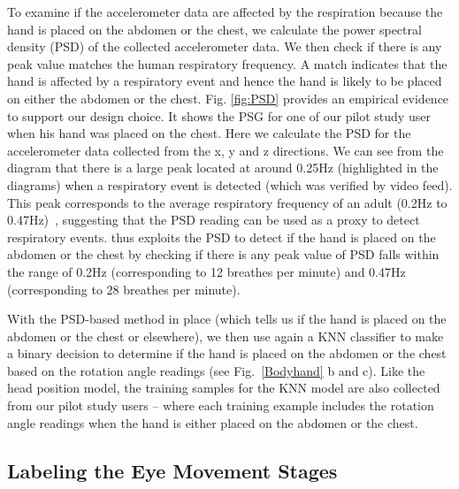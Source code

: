 To examine if the accelerometer data are affected by the respiration because the hand is placed on the abdomen or the chest, we calculate
the power spectral density (PSD) of the collected accelerometer data. We then check if there is any peak value matches the human
respiratory frequency. A match indicates that the hand is affected by a respiratory event and hence the hand is likely to be placed on
either the abdomen or the chest. Fig. \ref{fig:PSD} provides an empirical evidence to support our design choice. It shows the PSG for one
of our pilot study user when his hand was placed on the chest. Here we calculate the PSD for the accelerometer data collected from the x, y
and z directions. We can see from the diagram that there is a large peak located at around 0.25Hz (highlighted in the diagrams) when a
respiratory event is detected (which was verified by video feed). This peak corresponds to the average respiratory frequency of an
adult (0.2Hz to 0.47Hz)~\cite{Breath_frequence}, suggesting that the PSD reading can be used as a proxy to detect respiratory events.
\systemname thus exploits the PSD to detect if the hand is placed on the abdomen or the chest by checking if there is any peak value of PSD
falls within the range of 0.2Hz (corresponding to 12 breathes per minute) and 0.47Hz (corresponding to 28 breathes per minute).

With the PSD-based method in place (which tells us if the hand is placed on the abdomen or the chest or elsewhere), we then use again a KNN
classifier to make a binary decision to determine if the hand is placed on the abdomen or the chest based on the rotation angle readings
(see Fig.~\ref{Bodyhand} b and c). Like the head position model, the training samples for the KNN model are also collected from our pilot
study users -- where each training example includes the rotation angle readings when the hand is either placed on the abdomen or the chest.

\subsection{Labeling the Eye Movement Stages}

